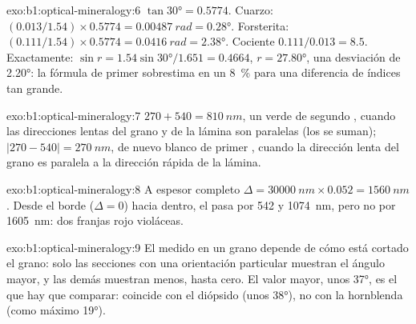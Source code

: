 \begin{solution}{exo:b1:optical-mineralogy:6}
$\tan\ang{30} = 0.5774$. Cuarzo: $(0.013/1.54)\times0.5774 = \qty{0.00487}{rad}
= \ang{0.28}$. Forsterita: $(0.111/1.54)\times0.5774 = \qty{0.0416}{rad} =
\ang{2.38}$. Cociente $0.111/0.013 = 8.5$. Exactamente: $\sin r = 1.54\sin\ang{30}/1.651
= 0.4664$, $r = \ang{27.80}$, una desviación de \ang{2.20}: la fórmula de primer  sobrestima en un
\qty{8}{\percent} para una diferencia de índices tan grande.
\end{solution}

\begin{solution}{exo:b1:optical-mineralogy:7}
$270 + 540 = \qty{810}{nm}$, un verde de segundo , cuando las direcciones lentas del grano y de la lámina son
paralelas (los  se suman); $|270 - 540| =
\qty{270}{nm}$, de nuevo blanco de primer , cuando la dirección
lenta del grano es paralela a la dirección rápida de la lámina.
\end{solution}

\begin{solution}{exo:b1:optical-mineralogy:8}
A espesor completo $\Delta = \qty{30000}{nm}\times0.052 = \qty{1560}{nm}$. Desde el borde ($\Delta = 0$) hacia dentro, el
 pasa por 542 y \qty{1074}{nm}, pero no por \qty{1605}{nm}: dos franjas rojo violáceas.
\end{solution}

\begin{solution}{exo:b1:optical-mineralogy:9}
El  medido en un grano depende de cómo está cortado el grano: solo las secciones con una orientación
particular muestran el ángulo mayor, y las demás muestran menos, hasta cero. El valor mayor, unos \ang{37}, es el que hay
que comparar: coincide con el diópsido (unos \ang{38}), no con la hornblenda (como máximo \ang{19}).
\end{solution}

